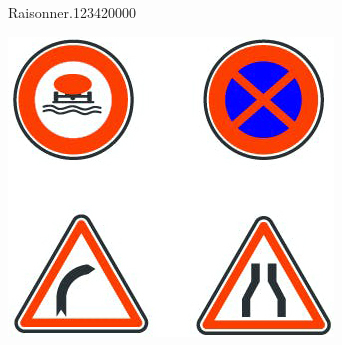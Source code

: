 \begin{pageAuto}
\begin{ExoAuto}{Raisonner.}{1234}{2}{0}{0}{0}{0}
 
\begin{center}
 \includegraphics[scale=0.5]{FIG/panneaux4.jpg} 
\end{center}
 

\end{ExoAuto}

 



\end{pageAuto}



